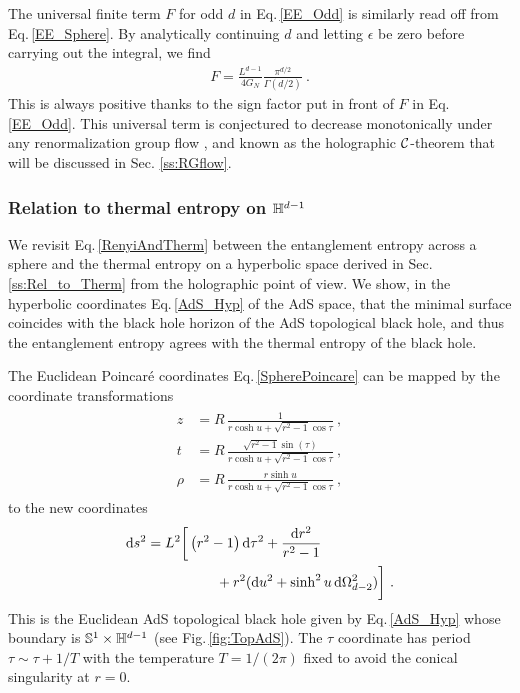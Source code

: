 The universal finite term $F$ for odd $d$ in Eq.\,\eqref{EE_Odd} is similarly read off from Eq.\,\eqref{EE_Sphere}.
By analytically continuing $d$ and letting $\epsilon$ be zero before carrying out the integral, we find \cite{Kawano:2014moa}
\begin{align}\label{CFT_F_value}
F = \frac{L^{d-1}}{4G_N} \frac{\pi^{d/2}}{\Gamma(d/2)} \ .
\end{align}
This is always positive thanks to the sign factor put in front of $F$ in Eq.\,\eqref{EE_Odd}.
This universal term is conjectured to decrease monotonically under any renormalization group flow \cite{Myers:2010xs,Myers:2010tj,Klebanov:2011gs}, and known as the holographic ${\cal C}$-theorem \cite{Girardello:1998pd,Freedman:1999gp,Myers:2010xs,Myers:2010tj} that will be discussed in Sec. \ref{ss:RGflow}.


\subsubsection{Relation to thermal entropy on $\mathbb{H}^{d-1}$}\label{ss:HEE_thermal}
We revisit Eq.\,\eqref{RenyiAndTherm} between the entanglement entropy across a sphere and the thermal entropy on a hyperbolic space derived in Sec. \ref{ss:Rel_to_Therm} from the holographic point of view.
We show, in the hyperbolic coordinates Eq.\,\eqref{AdS_Hyp} of the AdS space, that the minimal surface coincides with the black hole horizon of the AdS topological black hole, and thus the entanglement entropy agrees with the thermal entropy of the black hole.


The Euclidean Poincar{\'e} coordinates Eq.\,\eqref{SpherePoincare} can be mapped by the coordinate transformations
\begin{align}\label{BulkCM}
\begin{aligned}
z &= R\,\frac{1}{r\cosh u + \sqrt{r^2 - 1} \cos \tau} \ , \\
t &= R\, \frac{\sqrt{r^2 -1} \sin(\tau)}{r\cosh u + \sqrt{r^2 -1} \cos \tau} \ , \\
\rho &= R\, \frac{ r \sinh u}{r\cosh u + \sqrt{r^2 -1} \cos \tau} \ ,
\end{aligned}
\end{align}
to the new coordinates 
\begin{align}\label{AdS_Hyp2}
\begin{aligned}
\mathrm{d} s^2 = L^2 \bigg[& \left( r^2 -1\right) \mathrm{d}\tau^2 + \frac{\mathrm{d} r^2}{r^2 -1} \\
	&\qquad + r^2(\mathrm{d} u^2 + \sinh^2 u \,\mathrm{d}\Omega_{d-2}^2)\bigg] \ .
\end{aligned}
\end{align}
This is the Euclidean AdS topological black hole given by Eq.\,\eqref{AdS_Hyp} whose boundary is $\mathbb{S}^1\times \mathbb{H}^{d-1}$ (see Fig.\,\ref{fig:TopAdS}).
The $\tau$ coordinate has period $\tau\sim \tau + 1/T$ with the temperature $T=1/(2\pi)$ fixed to avoid the conical singularity at $r=0$.

